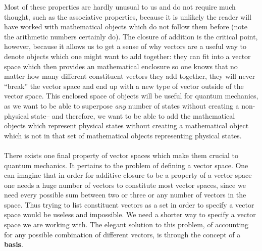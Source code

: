 Most of these properties are hardly unusual to us and do not require much thought, such as the associative properties, because it is unlikely the reader will have worked with mathematical objects which do not follow them before (note the arithmetic numbers certainly do). The closure of addition is the critical point, however, because it allows us to get a sense of why vectors are a useful way to denote objects which one might want to add together: they can fit into a vector space which then provides an mathematical enclosure so one knows that no matter how many different constituent vectors they add together, they will never ``break'' the vector space and end up with a new type of vector outside of the vector space. This enclosed space of objects will be useful for quantum mechanics, as we want to be able to superpose \textit{any} number of states without creating a non-physical state-- and therefore, we want to be able to add the mathematical objects which represent physical states without creating a mathematical object which is not in that set of mathematical objects representing physical states.
\\\\
There exists one final property of vector spaces which make them crucial to quantum mechanics. It pertains to the problem of defining a vector space. One can imagine that in order for additive closure to be a property of a vector space one needs a huge number of vectors to constitute most vector spaces, since we need every possible sum between two or three or any number of vectors in the space. Thus trying to list constituent vectors as a set in order to specify a vector space would be useless and impossible. We need a shorter way to specify a vector space we are working with. The elegant solution to this problem, of accounting for any possible combination of different vectors, is through the concept of a \textbf{basis}.
